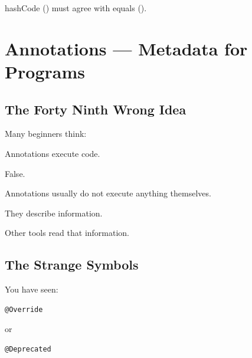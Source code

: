 \documentclass[11pt,a4paper]{book}
\begin{document}
\begin{rosettarule}

hashCode ()
must agree with equals ().

\end{rosettarule}
\chapter{Annotations --- Metadata for Programs}

\section{The Forty Ninth Wrong Idea}

\begin{trap}

Many beginners think:


Annotations execute code.


False.


Annotations usually do not
execute anything themselves.


They describe information.


Other tools read that information.

\end{trap}


\section{The Strange Symbols}

You have seen:

\begin{verbatim} 
@Override
\end{verbatim}

or

\begin{verbatim} 
@Deprecated
\end{verbatim}
\end{document}
